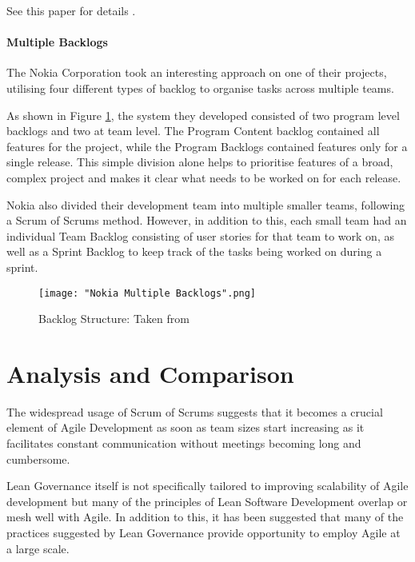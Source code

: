 \documentclass{scrartcl}
\begin{document}
See this paper for details \cite{ambler2009applying}.

\paragraph{Multiple Backlogs}\mbox{}\newline

The Nokia Corporation took an interesting approach on one of their projects, utilising four different types of backlog to organise tasks across multiple teams. \cite{laanti2008implementing}

As shown in Figure \ref{fig:backlogs}, the system they developed consisted of two program level backlogs and two at team level. The Program Content backlog contained all features for the project, while the Program Backlogs contained features only for a single release. This simple division alone helps to prioritise features of a broad, complex project and makes it clear what needs to be worked on for each release. 

Nokia also divided their development team into multiple smaller teams, following a Scrum of Scrums method. However, in addition to this, each small team had an individual Team Backlog consisting of user stories for that team to work on, as well as a Sprint Backlog to keep track of the tasks being worked on during a sprint. 
	
\begin{figure}
	\texttt{[image: "Nokia Multiple Backlogs".png]}
	\caption{Backlog Structure: Taken from \cite[p. ~1384]{laanti2008implementing}}
	\label{fig:backlogs}
\end{figure}


\section{Analysis and Comparison}

The widespread usage of Scrum of Scrums suggests that it becomes a crucial element of Agile Development as soon as team sizes start increasing as it facilitates constant communication without meetings becoming long and cumbersome.

Lean Governance itself is not specifically tailored to improving scalability of Agile development but many of the principles of Lean Software Development overlap or mesh well with Agile. In addition to this, it has been suggested that many of the practices suggested by Lean Governance provide opportunity to employ Agile at a large scale. \cite{ambler2009scaling}
\end{document}
